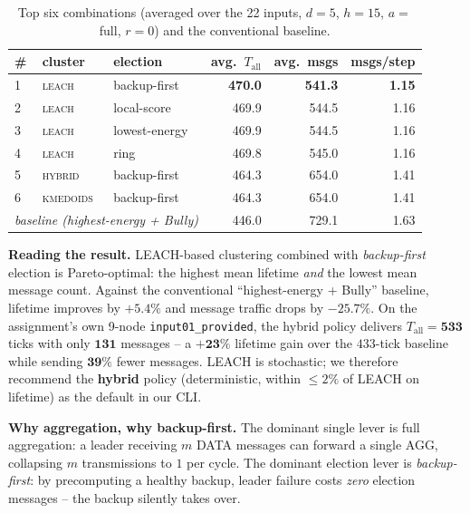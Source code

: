 \documentclass[a4paper,10pt]{article}
\begin{document}
\begin{table}[h]
\small\centering
\caption{Top six combinations (averaged over the 22 inputs, $d{=}5$, $h{=}15$, $a{=}$full, $r{=}0$) and the conventional baseline.}
\label{tab:summary}
\vspace{-0.4em}
\begin{tabular}{@{}lllrrr@{}}
\toprule
\# & cluster & election & avg.\ $T_{\text{all}}$ & avg.\ msgs & msgs/step \\
\midrule
1 & \textsc{leach}    & backup-first   & \textbf{470.0} & \textbf{541.3} & \textbf{1.15} \\
2 & \textsc{leach}    & local-score    & 469.9 & 544.5 & 1.16 \\
3 & \textsc{leach}    & lowest-energy  & 469.9 & 544.5 & 1.16 \\
4 & \textsc{leach}    & ring           & 469.8 & 545.0 & 1.16 \\
5 & \textsc{hybrid}   & backup-first   & 464.3 & 654.0 & 1.41 \\
6 & \textsc{kmedoids} & backup-first   & 464.3 & 654.0 & 1.41 \\
\midrule
\multicolumn{3}{l}{\textit{baseline (highest-energy + Bully)}} & 446.0 & 729.1 & 1.63 \\
\bottomrule
\end{tabular}
\end{table}

\textbf{Reading the result.} LEACH-based clustering combined with \textit{backup-first} election is Pareto-optimal:
the highest mean lifetime \emph{and} the lowest mean message count. Against the conventional ``highest-energy + Bully''
baseline, lifetime improves by $\mathbf{+5.4\%}$ and message traffic drops by $\mathbf{-25.7\%}$. On the assignment's own
9-node \texttt{input01\_provided}, the hybrid policy delivers $T_{\text{all}}=\mathbf{533}$ ticks with only
$\mathbf{131}$ messages -- a $\mathbf{+23\%}$ lifetime gain over the $433$-tick baseline while sending $\mathbf{39\%}$ fewer messages.
LEACH is stochastic; we therefore recommend the \textbf{hybrid} policy (deterministic, within $\le 2\%$ of LEACH on lifetime) as the default in our CLI.

\textbf{Why aggregation, why backup-first.} The dominant single lever is full aggregation: a leader receiving $m$ DATA
messages can forward a single AGG, collapsing $m$ transmissions to $1$ per cycle. The dominant election lever is
\textit{backup-first}: by precomputing a healthy backup, leader failure costs \emph{zero} election messages -- the
backup silently takes over.
\end{document}
